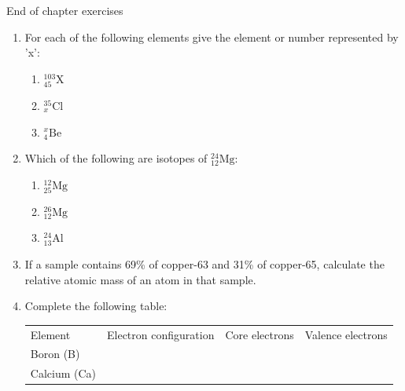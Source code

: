 \begin{eocexercises}{ End of chapter exercises}
\begin{enumerate}[noitemsep, label=\textbf{\arabic*}. ]
\item For each of the following elements give the element or number represented by 'x': \label{m38741*id7434324}\begin{enumerate}[noitemsep, label=\textbf{\alph*}. ] 
            \item $_{45}^{103}\mathrm{X}$\item $_{x}^{35}\mathrm{Cl}$\item $_{4}^{x}\mathrm{Be}$\end{enumerate}
\item Which of the following are isotopes of $_{12}^{24}\mathrm{Mg}$: \label{m38741*id743234}\begin{enumerate}[noitemsep, label=\textbf{\alph*}. ] 
            \item $_{25}^{12}\mathrm{Mg}$\item $_{12}^{26}\mathrm{Mg}$\item $_{13}^{24}\mathrm{Al}$\end{enumerate}
\item If a sample contains 69\% of copper-63 and 31\% of copper-65, calculate the relative atomic mass of an atom in that sample.\newline
            \item Complete the following table:
          \begin{table}[H]
        \begin{center}
      \label{m38741*eip-282}
    \noindent
      \tablelasttail{}
      \begin{xtabular}[t]{|l|l|l|l|}\hline
        Element &
        Electron configuration &
        Core electrons &
        Valence electrons%
     \tabularnewline{}
        Boron (B) &
         &
         &
     \tabularnewline{}
        Calcium (Ca) &
         &
         &
     \tabularnewline{}

\end{xtabular}
\end{center}
\end{table}
\end{enumerate}
\end{eocexercises}
